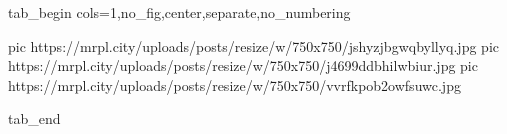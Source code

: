  
 
 
 
 

\ifcmt
  tab_begin cols=1,no_fig,center,separate,no_numbering

     pic https://mrpl.city/uploads/posts/resize/w/750x750/jshyzjbgwqbyllyq.jpg
     pic https://mrpl.city/uploads/posts/resize/w/750x750/j4699ddbhilwbiur.jpg
     pic https://mrpl.city/uploads/posts/resize/w/750x750/vvrfkpob2owfsuwc.jpg

  tab_end
\fi
